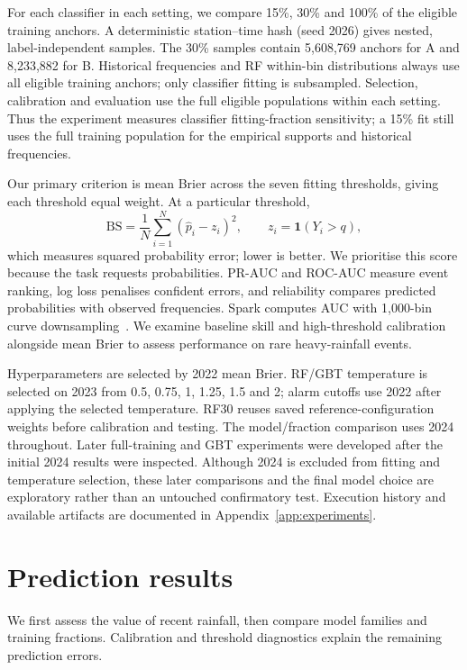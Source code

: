 For each classifier in each setting, we compare 15\%, 30\% and 100\% of the eligible training anchors. A deterministic station--time hash (seed 2026) gives nested, label-independent samples. The 30\% samples contain 5,608,769 anchors for A and 8,233,882 for B. Historical frequencies and RF within-bin distributions always use all eligible training anchors; only classifier fitting is subsampled. Selection, calibration and evaluation use the full eligible populations within each setting. Thus the experiment measures classifier fitting-fraction sensitivity; a 15\% fit still uses the full training population for the empirical supports and historical frequencies.

Our primary criterion is mean Brier across the seven fitting thresholds, giving each threshold equal weight. At a particular threshold,
\[
\mathrm{BS}=\frac{1}{N}\sum_{i=1}^{N}(\widehat p_i-z_i)^2,
\qquad z_i=\mathbf1(Y_i>q),
\]
which measures squared probability error; lower is better. We prioritise this score because the task requests probabilities. PR-AUC and ROC-AUC measure event ranking, log loss penalises confident errors, and reliability compares predicted probabilities with observed frequencies. Spark computes AUC with 1,000-bin curve downsampling~\cite{sparkeval}. We examine baseline skill and high-threshold calibration alongside mean Brier to assess performance on rare heavy-rainfall events.

Hyperparameters are selected by 2022 mean Brier. RF/GBT temperature is selected on 2023 from 0.5, 0.75, 1, 1.25, 1.5 and 2; alarm cutoffs use 2022 after applying the selected temperature. RF30 reuses saved reference-configuration weights before calibration and testing. The model/fraction comparison uses 2024 throughout. Later full-training and GBT experiments were developed after the initial 2024 results were inspected. Although 2024 is excluded from fitting and temperature selection, these later comparisons and the final model choice are exploratory rather than an untouched confirmatory test. Execution history and available artifacts are documented in Appendix~\ref{app:experiments}.

\clearpage
\section{Prediction results}
We first assess the value of recent rainfall, then compare model families and training fractions. Calibration and threshold diagnostics explain the remaining prediction errors.

